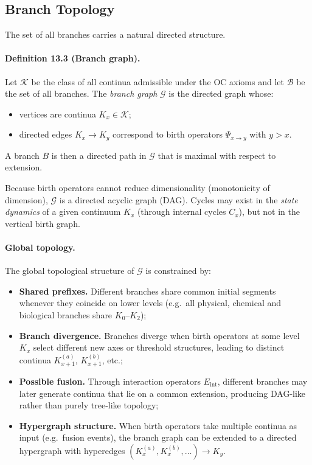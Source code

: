 \subsection{Branch Topology}

The set of all branches carries a natural directed structure.

\paragraph{Definition 13.3 (Branch graph).}
Let \(\mathcal{K}\) be the class of all continua admissible under the OC
axioms and let \(\mathcal{B}\) be the set of all branches. The
\emph{branch graph} \(\mathcal{G}\) is the directed graph whose:
\begin{itemize}
  \item vertices are continua \(K_x\in\mathcal{K}\);
  \item directed edges \(K_x \to K_y\) correspond to birth operators
        \(\Psi_{x\to y}\) with \(y > x\).
\end{itemize}
A branch \(B\) is then a directed path in \(\mathcal{G}\) that is maximal
with respect to extension.

Because birth operators cannot reduce dimensionality (monotonicity of
dimension), \(\mathcal{G}\) is a directed acyclic graph (DAG). Cycles may
exist in the \emph{state dynamics} of a given continuum \(K_x\) (through
internal cycles \(C_x\)), but not in the vertical birth graph.

\paragraph{Global topology.}
The global topological structure of \(\mathcal{G}\) is constrained by:
\begin{itemize}
  \item \textbf{Shared prefixes.}\quad
        Different branches share common initial segments whenever they
        coincide on lower levels (e.g.\ all physical, chemical and
        biological branches share \(K_0\)–\(K_2\));
  \item \textbf{Branch divergence.}\quad
        Branches diverge when birth operators at some level \(K_x\) select
        different new axes or threshold structures, leading to distinct
        continua \(K_{x+1}^{(a)}\), \(K_{x+1}^{(b)}\), etc.;
  \item \textbf{Possible fusion.}\quad
        Through interaction operators \(E_{\mathrm{int}}\), different
        branches may later generate continua that lie on a common extension,
        producing DAG-like rather than purely tree-like topology;
  \item \textbf{Hypergraph structure.}\quad
        When birth operators take multiple continua as input (e.g.\ fusion
        events), the branch graph can be extended to a directed hypergraph
        with hyperedges
        \((K_{x}^{(a)}, K_{x}^{(b)},\dots) \to K_{y}\).
\end{itemize}

